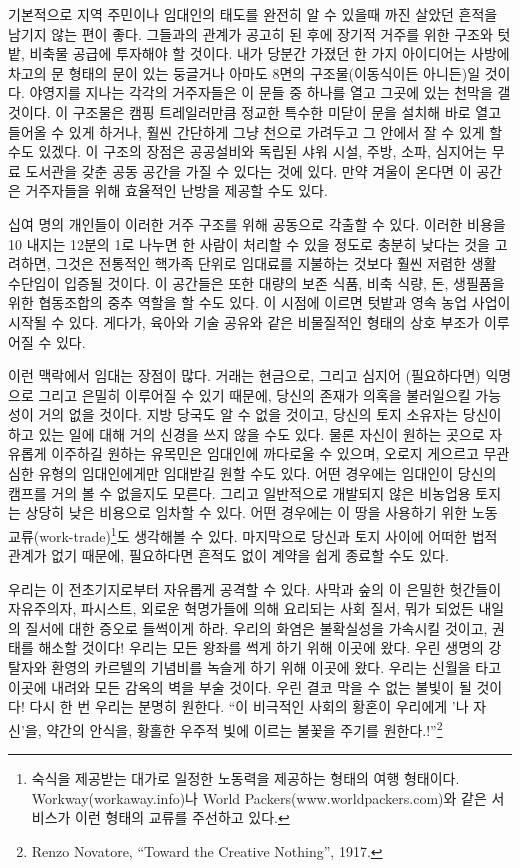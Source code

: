 \documentclass[11pt, b6paper, openany]{memoir}
\begin{document}
\begin{article}
기본적으로 지역 주민이나 임대인의 태도를 완전히 알 수 있을때 까진 살았던 흔적을 남기지 않는 편이 좋다. 그들과의  관계가 공고히 된 후에 장기적 거주를 위한 구조와 텃밭, 비축물 공급에 투자해야 할 것이다. 내가 당분간 가졌던 한 가지 아이디어는 사방에 차고의 문 형태의 문이 있는 둥글거나 아마도 8면의 구조물(이동식이든 아니든)일 것이다. 야영지를 지나는 각각의 거주자들은 이 문들 중 하나를 열고 그곳에 있는 천막을 갤 것이다. 이 구조물은 캠핑 트레일러만큼 정교한 특수한 미닫이 문을 설치해 바로 열고 들어올 수 있게 하거나, 훨씬 간단하게 그냥 천으로 가려두고 그 안에서 잘 수 있게 할 수도 있겠다. 이 구조의 장점은 공공설비와 독립된 샤워 시설, 주방, 소파, 심지어는 무료 도서관을 갖춘 공동 공간을 가질 수 있다는 것에 있다. 만약 겨울이 온다면 이 공간은 거주자들을 위해 효율적인 난방을 제공할 수도 있다.

십여 명의 개인들이 이러한 거주 구조를 위해 공동으로 각출할 수 있다. 이러한 비용을 10 내지는 12분의 1로 나누면 한 사람이 처리할 수 있을 정도로 충분히 낮다는 것을 고려하면, 그것은 전통적인 핵가족 단위로 임대료를 지불하는 것보다 훨씬 저렴한 생활 수단임이 입증될 것이다. 이 공간들은 또한 대량의 보존 식품, 비축 식량, 돈, 생필품을 위한 협동조합의 중추 역할을 할 수도 있다. 이 시점에 이르면 텃밭과 영속 농업 사업이 시작될 수 있다. 게다가, 육아와 기술 공유와 같은 비물질적인 형태의 상호 부조가 이루어질 수 있다. 

이런 맥락에서 임대는 장점이 많다. 거래는 현금으로, 그리고 심지어 (필요하다면) 익명으로 그리고 은밀히 이루어질 수 있기 때문에, 당신의 존재가 의혹을 불러일으킬 가능성이 거의 없을 것이다. 지방 당국도 알 수 없을 것이고, 당신의 토지 소유자는 당신이 하고 있는 일에 대해 거의 신경을 쓰지 않을 수도 있다. 물론 자신이 원하는 곳으로 자유롭게 이주하길 원하는 유목민은 임대인에 까다로울 수 있으며, 오로지 게으르고 무관심한 유형의 임대인에게만 임대받길 원할 수도 있다. 어떤 경우에는 임대인이 당신의 캠프를 거의 볼 수 없을지도 모른다. 그리고 일반적으로 개발되지 않은 비농업용 토지는 상당히 낮은 비용으로 임차할 수 있다. 어떤 경우에는 이 땅을 사용하기 위한 노동 교류(work-trade)\footnote{숙식을 제공받는 대가로 일정한 노동력을 제공하는 형태의 여행 형태이다. Workway(workaway.info)나 World Packers(www.worldpackers.com)와 같은 서비스가 이런 형태의 교류를 주선하고 있다.}도 생각해볼 수 있다. 마지막으로 당신과 토지 사이에 어떠한 법적 관계가 없기 때문에, 필요하다면 흔적도 없이 계약을 쉽게 종료할 수도 있다. 

우리는 이 전초기지로부터 자유롭게 공격할 수 있다. 사막과 숲의 이 은밀한 헛간들이 자유주의자, 파시스트, 외로운 혁명가들에 의해 요리되는 사회 질서, 뭐가 되었든 내일의 질서에 대한 증오로 들썩이게 하라. 우리의 화염은 불확실성을 가속시킬 것이고, 권태를 해소할 것이다! 우리는 모든 왕좌를 썩게 하기 위해 이곳에 왔다. 우린 생명의 강탈자와 환영의 카르텔의 기념비를 녹슬게 하기 위해 이곳에 왔다. 우리는 신월을 타고 이곳에 내려와 모든 감옥의 벽을 부술 것이다. 우린 결코 막을 수 없는 불빛이 될 것이다! 다시 한 번 우리는 분명히 원한다. “이 비극적인 사회의 황혼이 우리에게 '나 자신'을, 약간의 안식을, 황홀한 우주적 빛에 이르는 불꽃을 주기를 원한다.!”\footnote{Renzo Novatore, “Toward the Creative Nothing”, 1917.}


\end{article}
\end{document}
